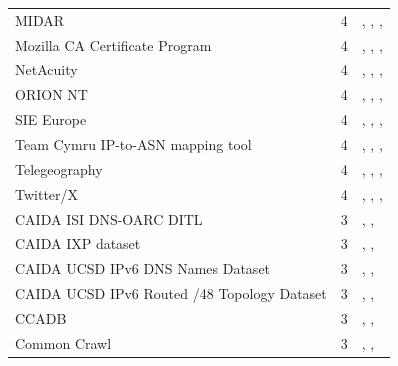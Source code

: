 \documentclass[11pt,a4paper]{article}
\begin{document}
\begin{longtable}{@{}p{} p{}p{}@{}}
MIDAR  & 4 & \cite{10.1145/3487552.3487812}, \cite{10.1007/978-3-030-98785-5_20}, \cite{10.1007/978-3-031-85960-1_4}, \cite{10.1007/978-3-031-85960-1_6} \\
Mozilla CA Certificate Program & 4 & \cite{10.1145/3618257.3624815}, \cite{10.1007/978-3-030-72582-2_11}, \cite{10.1007/978-3-031-28486-1_4}, \cite{10.1145/3646547.3688415} \\
NetAcuity  & 4 & \cite{10.1145/3517745.3561425}, \cite{10.1145/3487552.3487822}, \cite{10.1007/978-3-030-72582-2_4}, \cite{10.1007/978-3-030-98785-5_29} \\
ORION NT  & 4 & \cite{10.1145/3646547.3689012}, \cite{10.1145/3646547.3688451}, \cite{10.1145/3618257.3624818}, \cite{10.1145/3777912.3839831} \\
SIE Europe  & 4 & \cite{10.1145/3646547.3689017}, \cite{10.1007/978-3-031-56249-5_9}, \cite{10.1007/978-3-031-56249-5_10}, \cite{10.1145/3777912.3809157} \\
Team Cymru IP-to-ASN mapping tool  & 4 & \cite{10.1145/3487552.3487854}, \cite{10.1007/978-3-031-28486-1_10}, \cite{10.1007/978-3-031-85960-1_18}, \cite{10.1145/3777912.3839811} \\
Telegeography & 4 & \cite{10.1145/3517745.3561443}, \cite{10.1007/978-3-030-98785-5_29}, \cite{10.1145/3777912.3809135}, \cite{10.1145/3777912.3839834} \\
Twitter/X & 4 & \cite{10.1145/3618257.3624820}, \cite{10.1145/3618257.3624812}, \cite{10.1007/978-3-031-28486-1_8}, \cite{10.1145/3777912.3809150} \\
CAIDA ISI DNS-OARC DITL  & 3 & \cite{10.1007/978-3-030-72582-2_32}, \cite{10.1007/978-3-031-28486-1_21}, \cite{10.1145/3777912.3839813} \\
CAIDA IXP dataset  & 3 & \cite{10.1145/3487552.3487854}, \cite{10.1007/978-3-030-98785-5_29}, \cite{10.1145/3777912.3809137} \\
CAIDA UCSD IPv6 DNS Names Dataset & 3 & \cite{10.1145/3646547.3688449}, \cite{10.1007/978-3-031-85960-1_2}, \cite{10.1007/978-3-031-85960-1_3} \\
CAIDA UCSD IPv6 Routed /48 Topology Dataset  & 3 & \cite{10.1145/3487552.3487829}, \cite{10.1007/978-3-031-56252-5_10}, \cite{10.1145/3646547.3688449} \\
CCADB  & 3 & \cite{10.1145/3646547.3688415}, \cite{10.1145/3618257.3624815}, \cite{10.1145/3777912.3839820} \\
Common Crawl  & 3 & \cite{10.1145/3730567.3732913}, \cite{10.1145/3517745.3561437}, \cite{10.1007/978-3-031-85960-1_9} \\

\end{longtable}
\end{document}
